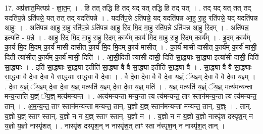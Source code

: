 \documentclass[17pt]{extarticle}
\begin{document}
17. अप्र॑ज्ञात॒मित्यप्र॑ - ज्ञा॒त॒म् । . हि तत् तद्धि हि तद् यद् यत् तद्धि हि तद् यत् । . तद् यद् यत् तत् तद् यदति॑प॒न्ने ऽति॑पन्ने॒ यत् तत् तद् यदति॑पन्ने । . यदति॑प॒न्ने ऽति॑पन्ने॒ यद् यदति॑पन्न आ॒हु रा॒हु रति॑पन्ने॒ यद् यदति॑पन्न आ॒हुः । . अति॑पन्न आ॒हु रा॒हु रति॑प॒न्ने ऽति॑पन्न आ॒हु रि॒द मि॒द मा॒हु रति॑प॒न्ने ऽति॑पन्न आ॒हु रि॒दम् । . अति॑पन्न॒ इत्यति॑ - प॒न्ने॒ । . आ॒हु रि॒द मि॒द मा॒हु रा॒हु रि॒दम् का॒र्य॑म् का॒र्य॑ मि॒द मा॒हु रा॒हु रि॒दम् का॒र्य᳚म् । . इ॒दम् का॒र्य॑म् का॒र्य॑ मि॒द मि॒दम् का॒र्य॑ मासी दासीत् का॒र्य॑ मि॒द मि॒दम् का॒र्य॑ मासीत् । . का॒र्य॑ मासी दासीत् का॒र्य॑म् का॒र्य॑ मासी॒ दिती त्या॑सीत् का॒र्य॑म् का॒र्य॑ मासी॒ दिति॑ । . आ॒सी॒दिती त्या॑सी दासी॒ दिति॑ सा॒द्ध्याः सा॒द्ध्या इत्या॑सी दासी॒ दिति॑ सा॒द्ध्याः । . इति॑ सा॒द्ध्याः सा॒द्ध्या इतीति॑ सा॒द्ध्या वै वै सा॒द्ध्या इतीति॑ सा॒द्ध्या वै । . सा॒द्ध्या वै वै सा॒द्ध्याः सा॒द्ध्या वै दे॒वा दे॒वा वै सा॒द्ध्याः सा॒द्ध्या वै दे॒वाः । . वै दे॒वा दे॒वा वै वै दे॒वा य॒ज्ञ्ं ॅय॒ज्ञ्म् दे॒वा वै वै दे॒वा य॒ज्ञ्म् । . दे॒वा य॒ज्ञ्ं ॅय॒ज्ञ्म् दे॒वा दे॒वा य॒ज्ञ् मत्यति॑ य॒ज्ञ्म् दे॒वा दे॒वा य॒ज्ञ् मति॑ । . य॒ज्ञ् मत्यति॑ य॒ज्ञ्ं ॅय॒ज्ञ् मत्य॑मन्यन्ता मन्य॒न्ताति॑ य॒ज्ञ्ं ॅय॒ज्ञ् मत्य॑मन्यन्त । . अत्य॑मन्यन्ता मन्य॒न्ता त्य त्य॑मन्यन्त॒ ताꣳ स्तान॑मन्य॒न्ता त्य त्य॑मन्यन्त॒ तान् । . अ॒म॒न्य॒न्त॒ ताꣳ स्तान॑मन्यन्ता मन्यन्त॒ तान्. य॒ज्ञो य॒ज्ञ् स्तान॑मन्यन्ता मन्यन्त॒ तान्. य॒ज्ञ्ः । . तान्. य॒ज्ञो य॒ज्ञ् स्ताꣳ स्तान्. य॒ज्ञो न न य॒ज्ञ् स्ताꣳ स्तान्. य॒ज्ञो न । . य॒ज्ञो न न य॒ज्ञो य॒ज्ञो नास्पृ॑श दस्पृश॒न् न य॒ज्ञो य॒ज्ञो नास्पृ॑शत् । . नास्पृ॑श दस्पृश॒न् न नास्पृ॑श॒त् ताꣳ स्ता न॑स्पृश॒न् न नास्पृ॑श॒त् तान् । \newline
\end{document}
